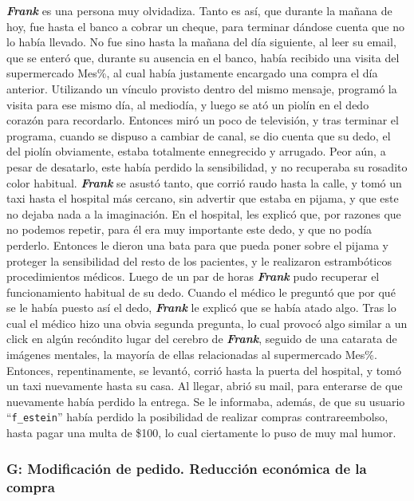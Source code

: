 \textbf{\emph{Frank}} es una persona muy olvidadiza. Tanto es así, que durante
la mañana de hoy, fue hasta el banco a cobrar un cheque, para terminar dándose
cuenta que no lo había llevado. No fue sino hasta la mañana del día siguiente,
al leer su email, que se enteró que, durante su ausencia en el banco, había
recibido una visita del supermercado Mes\%, al cual había justamente encargado
una compra el día anterior. Utilizando un vínculo provisto dentro del mismo
mensaje, programó la visita para ese mismo día, al mediodía, y luego se ató un
piolín en el dedo corazón para recordarlo. Entonces miró un poco de televisión,
y tras terminar el programa, cuando se dispuso a cambiar de canal, se dio cuenta
que su dedo, el del piolín obviamente, estaba totalmente ennegrecido y arrugado.
Peor aún, a pesar de desatarlo, este había perdido la sensibilidad, y no
recuperaba su rosadito color habitual. \textbf{\emph{Frank}} se asustó tanto,
que corrió raudo hasta la calle, y tomó un taxi hasta el hospital más cercano,
sin advertir que estaba en pijama, y que este no dejaba nada a la imaginación.
En el hospital, les explicó que, por razones que no podemos repetir, para él era
muy importante este dedo, y que no podía perderlo. Entonces le dieron una bata
para que pueda poner sobre el pijama y proteger la sensibilidad del resto de los
pacientes, y le realizaron estrambóticos procedimientos médicos. Luego de un par
de horas \textbf{\emph{Frank}} pudo recuperar el funcionamiento habitual de su
dedo. Cuando el médico le preguntó que por qué se le había puesto así el dedo,
\textbf{\emph{Frank}} le explicó que se había atado algo. Tras lo cual el médico
hizo una obvia segunda pregunta, lo cual provocó algo similar a un click en
algún recóndito lugar del cerebro de \textbf{\emph{Frank}}, seguido de una
catarata de imágenes mentales, la mayoría de ellas relacionadas al supermercado
Mes\%. Entonces, repentinamente, se levantó, corrió hasta la puerta del
hospital, y tomó un taxi nuevamente hasta su casa. Al llegar, abrió su mail,
para enterarse de que nuevamente había perdido la entrega. Se le informaba,
además, de que su usuario ``\texttt{f\_estein}'' había perdido la posibilidad de
realizar compras contrareembolso, hasta pagar una multa de \$100, lo cual
ciertamente lo puso de muy mal humor.

\subsubsection{G: Modificación de pedido. Reducción económica de la compra}

